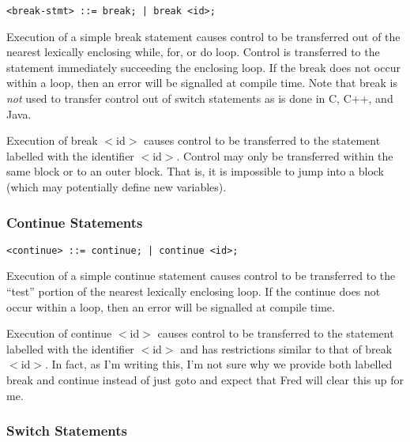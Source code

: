 \documentclass[titlepage,10pt]{article}
\begin{document}

\begin{verbatim}
<break-stmt> ::= break; | break <id>;
\end{verbatim}

Execution of a simple break statement causes control to be transferred
out of the nearest lexically enclosing while, for, or do loop.  Control
is transferred to the statement immediately succeeding the enclosing
loop.  If the break does not occur within a loop, then an error will be
signalled at compile time.  Note that break is \textit{not} used to
transfer control out of switch statements as is done in C, C++, and
Java.

Execution of break $<$id$>$ causes control to be transferred to the
statement labelled with the identifier $<$id$>$.  Control may only be
transferred within the same block or to an outer block.  That is, it is
impossible to jump into a block (which may potentially define new
variables).


\subsubsection{Continue Statements}


\begin{verbatim}
<continue> ::= continue; | continue <id>;
\end{verbatim}

Execution of a simple continue statement causes control to be
transferred to the ``test'' portion of the nearest lexically enclosing
loop.  If the continue does not occur within a loop, then an error will
be signalled at compile time.

Execution of continue $<$id$>$ causes control to be transferred to the
statement labelled with the identifier $<$id$>$ and has restrictions
similar to that of break $<$id$>$.  In fact, as I'm writing this, I'm
not sure why we provide both labelled break and continue instead of just
goto and expect that Fred will clear this up for me.


\subsubsection{Switch Statements}
\end{document}
